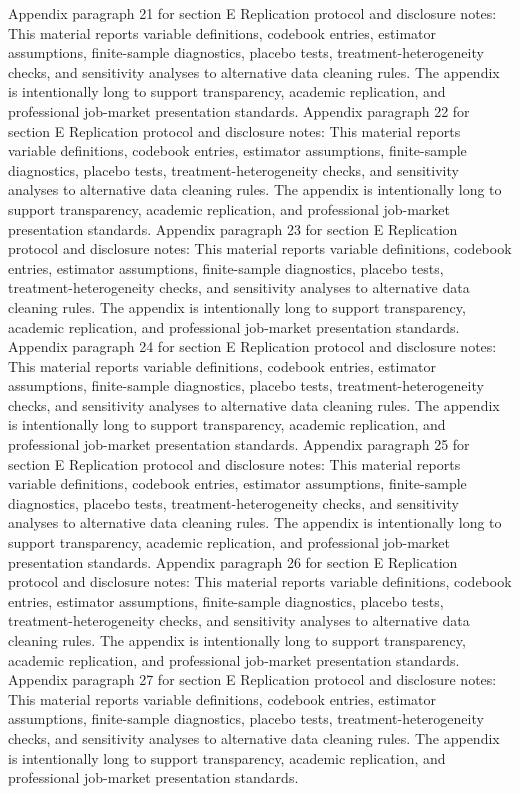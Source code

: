 \documentclass[preprint,12pt]{elsarticle}
\begin{document}
Appendix paragraph 21 for section E Replication protocol and disclosure notes: This material reports variable definitions, codebook entries, estimator assumptions, finite-sample diagnostics, placebo tests, treatment-heterogeneity checks, and sensitivity analyses to alternative data cleaning rules. The appendix is intentionally long to support transparency, academic replication, and professional job-market presentation standards.
Appendix paragraph 22 for section E Replication protocol and disclosure notes: This material reports variable definitions, codebook entries, estimator assumptions, finite-sample diagnostics, placebo tests, treatment-heterogeneity checks, and sensitivity analyses to alternative data cleaning rules. The appendix is intentionally long to support transparency, academic replication, and professional job-market presentation standards.
Appendix paragraph 23 for section E Replication protocol and disclosure notes: This material reports variable definitions, codebook entries, estimator assumptions, finite-sample diagnostics, placebo tests, treatment-heterogeneity checks, and sensitivity analyses to alternative data cleaning rules. The appendix is intentionally long to support transparency, academic replication, and professional job-market presentation standards.
Appendix paragraph 24 for section E Replication protocol and disclosure notes: This material reports variable definitions, codebook entries, estimator assumptions, finite-sample diagnostics, placebo tests, treatment-heterogeneity checks, and sensitivity analyses to alternative data cleaning rules. The appendix is intentionally long to support transparency, academic replication, and professional job-market presentation standards.
Appendix paragraph 25 for section E Replication protocol and disclosure notes: This material reports variable definitions, codebook entries, estimator assumptions, finite-sample diagnostics, placebo tests, treatment-heterogeneity checks, and sensitivity analyses to alternative data cleaning rules. The appendix is intentionally long to support transparency, academic replication, and professional job-market presentation standards.
Appendix paragraph 26 for section E Replication protocol and disclosure notes: This material reports variable definitions, codebook entries, estimator assumptions, finite-sample diagnostics, placebo tests, treatment-heterogeneity checks, and sensitivity analyses to alternative data cleaning rules. The appendix is intentionally long to support transparency, academic replication, and professional job-market presentation standards.
Appendix paragraph 27 for section E Replication protocol and disclosure notes: This material reports variable definitions, codebook entries, estimator assumptions, finite-sample diagnostics, placebo tests, treatment-heterogeneity checks, and sensitivity analyses to alternative data cleaning rules. The appendix is intentionally long to support transparency, academic replication, and professional job-market presentation standards.
\end{document}
